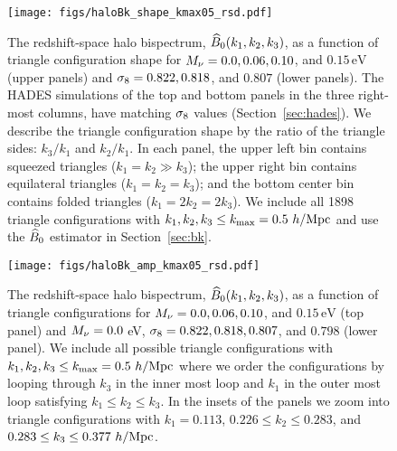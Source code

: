 \begin{figure}
\begin{center}
    \texttt{[image: figs/haloBk\_shape\_kmax05\_rsd.pdf]} 
    \caption{The redshift-space halo bispectrum, $\widehat{B}_0(k_1, k_2, k_3)$, as a 
    function of triangle configuration shape for $M_\nu = 0.0, 0.06, 0.10$, 
    and $0.15\,\mathrm{eV}$ (upper panels) and $\sigma_8 = 0.822, 0.818$, and 
    $0.807$ (lower panels). The HADES simulations of the top and bottom 
    panels in the three right-most columns, have matching $\sigma_8$ values 
    (Section~\ref{sec:hades}). We describe the triangle configuration shape 
    by the ratio of the triangle sides: $k_3/k_1$ and $k_2/k_1$. In each
    panel, the upper left bin contains squeezed triangles ($k_1 = k_2 \gg k_3$); 
    the upper right bin contains equilateral triangles ($k_1 = k_2 = k_3$); 
    and the bottom center bin contains folded triangles ($k_1 = 2 k_2 = 2 k_3$). 
    We include all 1898 triangle configurations with 
    $k_1, k_2, k_3 \leq k_{\rm max} = 0.5~h/{\rm Mpc}$ and use the $\widehat{B}_0$ estimator in Section~\ref{sec:bk}.}
\label{fig:bk_shape}
\end{center}
\end{figure}

\begin{figure}
\begin{center}
\texttt{[image: figs/haloBk\_amp\_kmax05\_rsd.pdf]}
    \caption{The redshift-space halo bispectrum, $\widehat{B}_0(k_1, k_2, k_3)$, as a
    function of triangle configurations for $M_\nu = 0.0, 0.06, 0.10$, 
    and $0.15\,\mathrm{eV}$ (top panel) and $M_\nu = 0.0$ eV, $\sigma_8 = 0.822, 0.818, 0.807$, 
    and $0.798$ (lower panel). We include all possible triangle configurations 
    with $k_1, k_2, k_3 \leq k_{\rm max} = 0.5~h/{\rm Mpc}$ where we order
    the configurations by looping through $k_3$ in the inner most loop and 
    $k_1$ in the outer most loop satisfying $k_1 \leq k_2 \leq k_3$. In the 
    insets of the panels we zoom into triangle configurations with 
    $k_1 = 0.113$, $0.226 \leq k_2 \leq 0.283$, and $0.283 \leq k_3 \leq 0.377~h/{\rm Mpc}$.}
\label{fig:bk_amp}
\end{center}
\end{figure}

